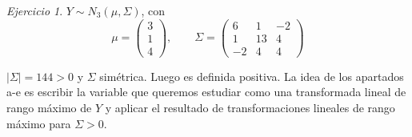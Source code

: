 \documentclass[12pt,spanish]{article}
\theoremstyle{definition}
\theoremstyle{remark}
\newtheorem{exercise}{Ejercicio}
\begin{document}
\setcounter{exercise}{6}
\begin{exercise}
  $Y\sim N_3(\mu,\Sigma)$, con
  \[\mu=
    \begin{pmatrix}
      3 \\
      1 \\
      4
    \end{pmatrix},\qquad \Sigma=
    \begin{pmatrix}
      6 & 1 & -2 \\
      1 & 13 & 4 \\
      -2 & 4 & 4
    \end{pmatrix}
  \]

  $|\Sigma|=144>0$ y $\Sigma$ simétrica. Luego es definida
  positiva. La idea de los apartados a-e es escribir la variable que
  queremos estudiar como una transformada lineal de rango máximo de
  $Y$ y aplicar el resultado de transformaciones lineales de rango
  máximo para $\Sigma>0$.
  

\end{exercise}
\end{document}
